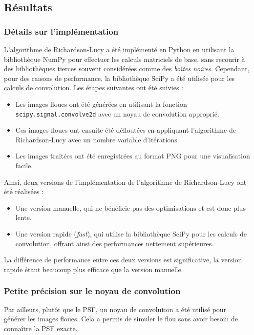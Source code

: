 \subsection{Résultats}

\subsubsection{Détails sur l'implémentation}

L'algorithme de Richardson-Lucy a été implémenté en Python en utilisant la bibliothèque NumPy pour effectuer les calculs matriciels de base, sans recourir à des bibliothèques tierces souvent considérées comme des \textit{boîtes noires}. Cependant, pour des raisons de performance, la bibliothèque SciPy a été utilisée pour les calculs de convolution. Les étapes suivantes ont été suivies :

\begin{itemize}
    \item Les images floues ont été générées en utilisant la fonction \texttt{scipy.signal.convolve2d} avec un noyau de convolution approprié.
    \item Ces images floues ont ensuite été défloutées en appliquant l'algorithme de Richardson-Lucy avec un nombre variable d'itérations.
    \item Les images traitées ont été enregistrées au format PNG pour une visualisation facile.
\end{itemize}

Ainsi, deux versions de l'implémentation de l'algorithme de Richardson-Lucy ont été réalisées :
\begin{itemize}
    \item Une version manuelle, qui ne bénéficie pas des optimisations et est donc plus lente.
    \item Une version rapide (\textit{fast}), qui utilise la bibliothèque SciPy pour les calculs de convolution, offrant ainsi des performances nettement supérieures.
\end{itemize}

La différence de performance entre ces deux versions est significative, la version rapide étant beaucoup plus efficace que la version manuelle.

\subsubsection{Petite précision sur le noyau de convolution}

Par ailleurs, plutôt que le PSF, un noyau de convolution a été utilisé pour générer les images floues. Cela a permis de simuler le flou sans avoir besoin de connaître la PSF exacte.

